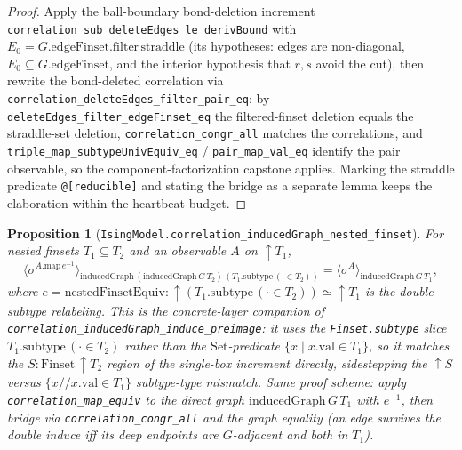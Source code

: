 \documentclass[a4paper,11pt]{article}
\newtheorem{proposition}[theorem]{Proposition}
\begin{document}
\begin{proof}
Apply the ball-boundary bond-deletion increment
\texttt{correlation\_sub\_deleteEdges\_le\_derivBound} with
$E_0=G.\mathrm{edgeFinset.filter}\,\mathrm{straddle}$ (its hypotheses: edges are
non-diagonal, $E_0\subseteq G.\mathrm{edgeFinset}$, and the interior hypothesis
that $r,s$ avoid the cut), then rewrite the bond-deleted correlation via
\texttt{correlation\_deleteEdges\_filter\_pair\_eq}: by
\texttt{deleteEdges\_filter\_edgeFinset\_eq} the filtered-finset deletion equals
the straddle-set deletion, \texttt{correlation\_congr\_all} matches the
correlations, and \texttt{triple\_map\_subtypeUnivEquiv\_eq} /
\texttt{pair\_map\_val\_eq} identify the pair observable, so the
component-factorization capstone applies. Marking the straddle predicate
\texttt{@[reducible]} and stating the bridge as a separate lemma keeps the
elaboration within the heartbeat budget.
\end{proof}

\begin{proposition}[\texttt{IsingModel.correlation\_inducedGraph\_nested\_finset}]
For nested finsets $T_1\subseteq T_2$ and an observable $A$ on $\uparrow T_1$,
\[
  \langle\sigma^{A.\mathrm{map}\,e^{-1}}\rangle_{\mathrm{inducedGraph}\,
    (\mathrm{inducedGraph}\,G\,T_2)\,(T_1.\mathrm{subtype}\,(\cdot\in T_2))}
  = \langle\sigma^{A}\rangle_{\mathrm{inducedGraph}\,G\,T_1},
\]
where $e=\mathrm{nestedFinsetEquiv}\colon \uparrow(T_1.\mathrm{subtype}\,(\cdot\in
T_2))\simeq\uparrow T_1$ is the double-subtype relabeling. This is the
concrete-layer companion of \texttt{correlation\_inducedGraph\_induce\_preimage}:
it uses the \texttt{Finset.subtype} slice $T_1.\mathrm{subtype}\,(\cdot\in T_2)$
rather than the $\mathrm{Set}$-predicate $\{x\mid x.\mathrm{val}\in T_1\}$, so it
matches the $S:\mathrm{Finset}\,\uparrow T_2$ region of the single-box increment
directly, sidestepping the $\uparrow S$ versus $\{x\mathbin{/\!/}x.\mathrm{val}\in
T_1\}$ subtype-type mismatch. Same proof scheme: apply
\texttt{correlation\_map\_equiv} to the \emph{direct} graph
$\mathrm{inducedGraph}\,G\,T_1$ with $e^{-1}$, then bridge via
\texttt{correlation\_congr\_all} and the graph equality (an edge survives the
double induce iff its deep endpoints are $G$-adjacent and both in $T_1$).
\end{proposition}
\end{document}
